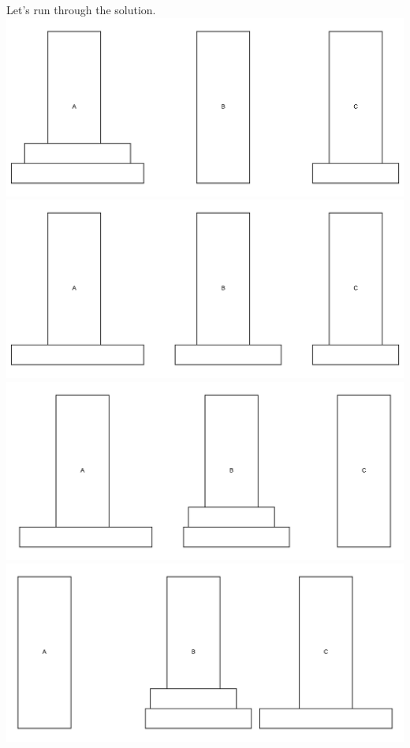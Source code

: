 \documentclass{article}
\begin{document}
Let's run through the solution.
\includegraphics[width=\textwidth,height=\textheight,keepaspectratio]{images/frame_1_delay-1s.png}
 \includegraphics[width=\textwidth,height=\textheight,keepaspectratio]{images/frame_2_delay-1s.png}
 \includegraphics[width=\textwidth,height=\textheight,keepaspectratio]{images/frame_3_delay-1s.png}
 \includegraphics[width=\textwidth,height=\textheight,keepaspectratio]{images/frame_4_delay-1s.png}
\end{document}
